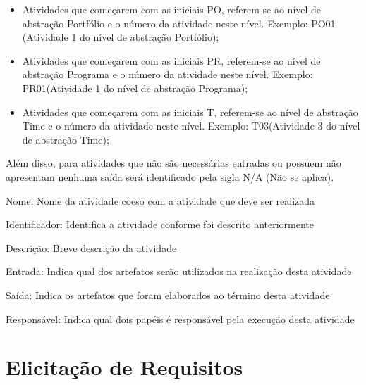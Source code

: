 \begin{itemize}
	\item Atividades que começarem com as iniciais PO, referem-se ao nível de abstração Portfólio e o número da atividade neste nível. Exemplo: PO01 (Atividade 1 do nível de abstração Portfólio);\\
	\item Atividades que começarem com as iniciais PR, referem-se ao nível de abstração Programa e o número da atividade neste nível. Exemplo: PR01(Atividade 1 do nível de abstração Programa);\\
	\item Atividades que começarem com as iniciais T, referem-se ao nível de abstração Time e o número da atividade neste nível. Exemplo: T03(Atividade 3 do nível de abstração Time); \\
\end{itemize}

\tab Além disso, para atividades que não são necessárias entradas ou possuem não apresentam nenhuma saída será identificado pela sigla N/A (Não se aplica).\\

\onecolumn
	\begin{usecase}

		\addfield
			{Nome:}
			{
				Nome da atividade coeso com a atividade que deve ser realizada
			}

		\addfield
			{Identificador:}
			{
				Identifica a atividade conforme foi descrito anteriormente
			}

		\addfield
			{Descrição:}
			{
				Breve descrição da atividade
			}

		\addfield
			{Entrada:}
			{
				Indica qual dos artefatos serão utilizados na realização desta atividade
			}

		\addfield
			{Saída:}
			{
				Indica os artefatos que foram elaborados ao término desta atividade
			}

		\addfield
			{Responsável:}
			{
				Indica qual dois papéis é responsável pela execução  desta atividade
			}

	\end{usecase}
\onecolumn





\section{Elicitação de Requisitos}
\label{sec:nova_sess_o}

